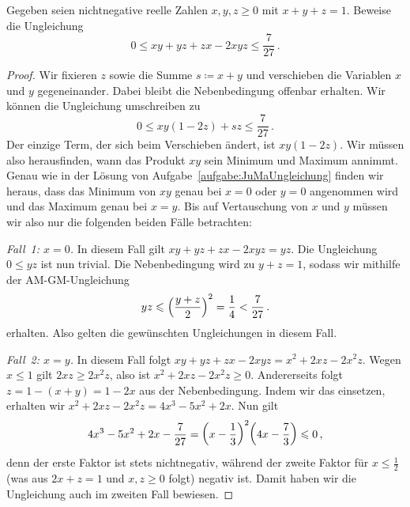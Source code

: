 \begin{aufgabe*}
	Gegeben seien nichtnegative reelle Zahlen $x,y,z\geqslant 0$ mit $x+y+z=1$. Beweise die Ungleichung
	\begin{equation*}
		0\leqslant xy+yz+zx-2xyz\leqslant\frac{7}{27}\,.
	\end{equation*}
\end{aufgabe*}
\begin{proof}
	Wir fixieren $z$ sowie die Summe $s\coloneqq x+y$ und verschieben die Variablen $x$ und $y$ gegeneinander. Dabei bleibt die Nebenbedingung offenbar erhalten. Wir können die Ungleichung umschreiben zu
	\begin{equation*}
		0\leqslant xy(1-2z)+sz\leqslant \frac{7}{27}\,.
	\end{equation*}
	Der einzige Term, der sich beim Verschieben ändert, ist $xy(1-2z)$. Wir müssen also herausfinden, wann das Produkt $xy$ sein Minimum und Maximum annimmt. Genau wie in der Lösung von Aufgabe~\ref{aufgabe:JuMaUngleichung} finden wir heraus, dass das Minimum von $xy$ genau bei $x=0$ oder $y=0$ angenommen wird und das Maximum genau bei $x=y$. Bis auf Vertauschung von $x$ und $y$ müssen wir also nur die folgenden beiden Fälle betrachten:
	
	\emph{Fall~1: $x=0$.} In diesem Fall gilt $xy+yz+zx-2xyz=yz$. Die Ungleichung $0\leqslant yz$ ist nun trivial. Die Nebenbedingung wird zu $y+z=1$, sodass wir mithilfe der AM-GM-Ungleichung
	\begin{equation*}
		yz\leqslant\parens*{\frac{y+z}{2}}^2=\frac{1}{4}<\frac{7}{27}\,.
	\end{equation*}
	erhalten. Also gelten die gewünschten Ungleichungen in diesem Fall.
	
	\emph{Fall~2: $x=y$.} In diesem Fall folgt $xy+yz+zx-2xyz=x^2+2xz-2x^2z$. Wegen $x\leqslant 1$ gilt $2xz\geqslant 2x^2z$, also ist $x^2+2xz-2x^2z\geqslant 0$. Andererseits folgt $z=1-(x+y)=1-2x$ aus der Nebenbedingung. Indem wir das einsetzen, erhalten wir $x^2+2xz-2x^2z=4x^3-5x^2+2x$. Nun gilt
	\begin{equation*}
		4x^3-5x^2+2x-\frac{7}{27}=\parens*{x-\frac13}^2\parens*{4x-\frac{7}{3}}\leqslant 0\,,
	\end{equation*}
	denn der erste Faktor ist stets nichtnegativ, während der zweite Faktor für $x\leqslant \frac12$ (was aus $2x+z=1$ und $x,z\geqslant 0$ folgt) negativ ist. Damit haben wir die Ungleichung auch im zweiten Fall bewiesen.
\end{proof}

